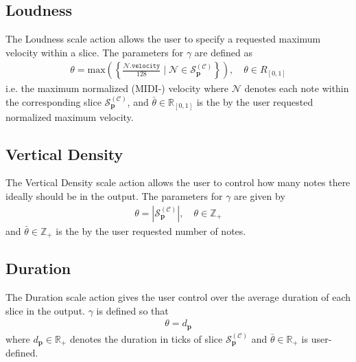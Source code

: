 	
\subsection{Loudness}
The Loudness scale action allows the user to specify a requested maximum velocity within a slice. The parameters for $\gamma$ are defined as
	\begin{align}
		\theta = \text{max}\left( \left\lbrace \frac{\mathcal N\texttt{.velocity}}{128} \;\vert\; \mathcal N \in \mathcal S_{\bm p}^{(\mathcal C)} \right\rbrace\right), \quad \theta \in R_{[0,1]}
	\end{align}
	i.e. the maximum normalized (MIDI-) velocity where $\mathcal N$ denotes each note within the corresponding slice $\mathcal S^{(\mathcal C)}_{\bm p}$, and $\bar{\theta} \in \mathbb R_{[0,1]}$ is the by the user requested normalized maximum velocity.
	
\subsection{Vertical Density} 
The Vertical Density scale action allows the user to control how many notes there ideally should be in the output. The parameters for $\gamma$ are given by
	\begin{align}
		\theta = \left\lvert \mathcal S^{(\mathcal C)}_{\bm p}\right\rvert, \quad \theta \in \mathbb Z_+	
	\end{align}
	and $\bar{\theta} \in \mathbb Z_+$ is the by the user requested number of notes.
	
\subsection{Duration}
The Duration scale action gives the user control over the average duration of each slice in the output. $\gamma$ is defined so that
	\begin{align}
		\theta = d_{\bm p}
	\end{align}
	where $d_{\bm p} \in \mathbb R_+$ denotes the duration in ticks of slice $\mathcal S^{(\mathcal C)}_{\bm p}$ and $\bar{\theta} \in \mathbb R_+$ is user-defined.


